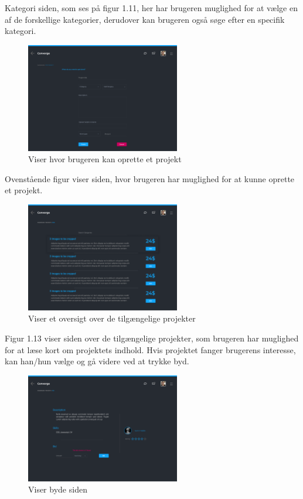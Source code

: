 Kategori siden, som ses på figur 1.11, her har brugeren muglighed for at vælge en af de forskellige kategorier, derudover kan brugeren også søge efter en specifik kategori.

\newpage
\begin{figure}[ht]
    \centering
\includegraphics[width=0.6\textwidth]{system-interface-pdf/Post-Project.pdf}
\caption{Viser hvor brugeren kan oprette et projekt}
\label{fig:figure2}
\end{figure}

Ovenstående figur viser siden, hvor brugeren har muglighed for at kunne oprette et projekt. 

\begin{figure}[ht]
    \centering
\includegraphics[width=0.6\textwidth]{system-interface-pdf/Product-job.pdf}
\caption{Viser et oversigt over de tilgængelige projekter}
\label{fig:figure2}
\end{figure}

Figur 1.13 viser siden over de tilgængelige projekter, som brugeren har muglighed for at læse kort om projektets indhold. Hvis projektet fanger brugerens interesse, kan han/hun vælge og gå videre ved at trykke byd. 

\newpage
\begin{figure}[ht]
    \centering
\includegraphics[width=0.6\textwidth]{system-interface-pdf/Job.pdf}
\caption{Viser byde siden}
\label{fig:figure2}
\end{figure}

